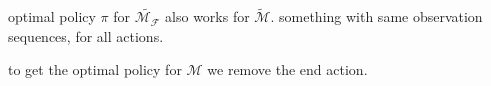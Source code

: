 
optimal policy $\pi$ for $\widetilde{\mathcal{M}_\mathcal{F}}$ also works for $\widetilde{\mathcal{M}}$. something with same observation sequences, for all actions.


to get the optimal policy for $\mathcal{M}$ we remove the end action. 